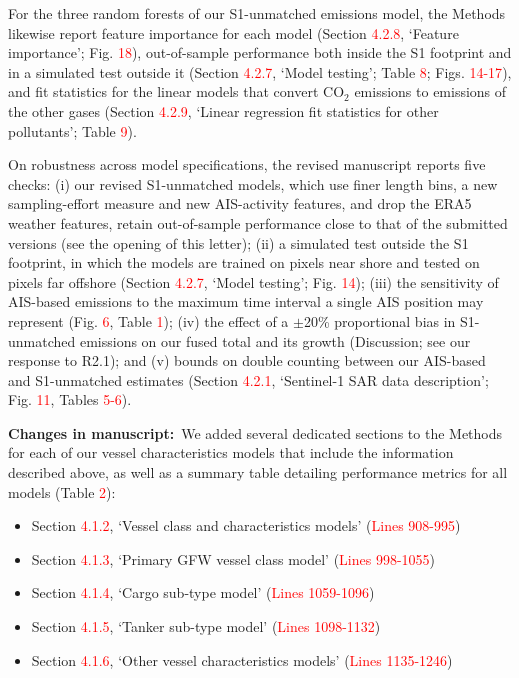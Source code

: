 \documentclass[11pt]{article}
\newcommand{\changes}{\par\medskip\noindent%
  \textbf{\textcolor{changegreen}{Changes in manuscript:}}\ }
\begin{document}
For the three random forests of our S1-unmatched emissions model, the Methods likewise report feature importance for each model (Section \textcolor{red}{4.2.8}, `Feature importance'; Fig. \textcolor{red}{18}), out-of-sample performance both inside the S1 footprint and in a simulated test outside it (Section \textcolor{red}{4.2.7}, `Model testing'; Table \textcolor{red}{8}; Figs. \textcolor{red}{14-17}), and fit statistics for the linear models that convert CO$_2$ emissions to emissions of the other gases (Section \textcolor{red}{4.2.9}, `Linear regression fit statistics for other pollutants'; Table \textcolor{red}{9}).

On robustness across model specifications, the revised manuscript reports five checks: (i) our revised S1-unmatched models, which use finer length bins, a new sampling-effort measure and new AIS-activity features, and drop the ERA5 weather features, retain out-of-sample performance close to that of the submitted versions (see the opening of this letter); (ii) a simulated test outside the S1 footprint, in which the models are trained on pixels near shore and tested on pixels far offshore (Section \textcolor{red}{4.2.7}, `Model testing'; Fig. \textcolor{red}{14}); (iii) the sensitivity of AIS-based emissions to the maximum time interval a single AIS position may represent (Fig. \textcolor{red}{6}, Table \textcolor{red}{1}); (iv) the effect of a $\pm$20\% proportional bias in S1-unmatched emissions on our fused total and its growth (Discussion; see our response to R2.1); and (v) bounds on double counting between our AIS-based and S1-unmatched estimates (Section \textcolor{red}{4.2.1}, `Sentinel-1 SAR data description'; Fig. \textcolor{red}{11}, Tables \textcolor{red}{5-6}).

\changes We added several dedicated sections to the Methods for each of our vessel characteristics models that include the information described above, as well as a summary table detailing performance metrics for all models (Table \textcolor{red}{2}):
\begin{itemize}
\item Section \textcolor{red}{4.1.2}, `Vessel class and characteristics models' (\textcolor{red}{Lines 908-995})
\item Section \textcolor{red}{4.1.3}, `Primary GFW vessel class model' (\textcolor{red}{Lines 998-1055})
\item Section \textcolor{red}{4.1.4}, `Cargo sub-type model' (\textcolor{red}{Lines 1059-1096})
\item Section \textcolor{red}{4.1.5}, `Tanker sub-type model' (\textcolor{red}{Lines 1098-1132})
\item Section \textcolor{red}{4.1.6}, `Other vessel characteristics models' (\textcolor{red}{Lines 1135-1246})
\end{itemize}
\end{document}
